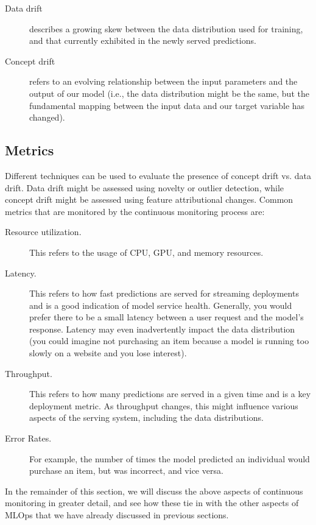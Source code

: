 {{{{{{{{    \begin{description}
      \item[Data drift] describes a growing skew between the data distribution used for training, and that currently exhibited in the newly served predictions. 
      \item[Concept drift] refers to an evolving relationship between the input parameters and the output of our model (i.e., the data distribution might be the same, but the fundamental mapping between the input data and our target variable has changed).
    \end{description}
    
    \subsection{Metrics}
    
    Different techniques can be used to evaluate the presence of concept drift vs. data drift. Data drift might be assessed using novelty or outlier detection, while concept drift might be assessed using feature attributional changes. Common metrics that are monitored by the continuous monitoring process are:
    
    \begin{description}
      \item[Resource utilization.] This refers to the usage of CPU, GPU, and memory resources.
      \item[Latency.] This refers to how fast predictions are served for streaming deployments and is a good indication of model service health. Generally, you would prefer there to be a small latency between a user request and the model’s response. Latency may even inadvertently impact the data distribution (you could imagine not purchasing an item because a model is running too slowly on a website and you lose interest).
      \item[Throughput.] This refers to how many predictions are served in a given time and is a key deployment metric. As throughput changes, this might influence various aspects of the serving system, including the data distributions.
      \item[Error Rates.] For example, the number of times the model predicted an individual would purchase an item, but was incorrect, and vice versa.
    \end{description}
    
    In the remainder of this section, we will discuss the above aspects of continuous monitoring in greater detail, and see how these tie in with the other aspects of MLOps that we have already discussed in previous sections.
    
}}}}}}}}

